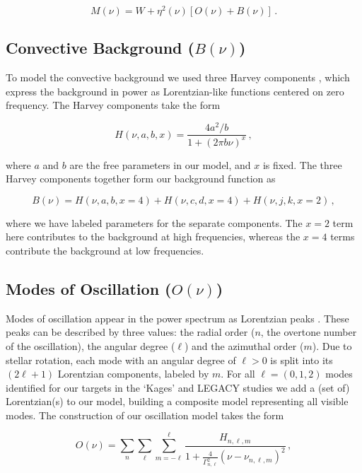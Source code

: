 \begin{equation}\label{eq:model}
	M(\nu) = W + \eta^2(\nu)[O(\nu) + B(\nu)]\, .
\end{equation}

\subsection{Convective Background ($B(\nu)$)}
To model the convective background we used three Harvey components \cite{harvey1985}, which express the background in power as Lorentzian-like functions centered on zero frequency. The Harvey components take the form 

\begin{equation}
	H(\nu, a, b, x) = \frac{4a^2/b}{1 + (2\pi b\nu)^x}\, ,
\end{equation}

\noindent where $a$ and $b$ are the free parameters in our model, and $x$ is fixed. The three Harvey components together form our background function as

\begin{equation}\label{eq:background}
	B(\nu) = H(\nu, a, b, x=4) + H(\nu, c, d, x=4) + H(\nu, j, k, x=2)\, ,
\end{equation}

\noindent where we have labeled parameters for the separate components. The $x = 2$ term here contributes to the background at high frequencies, whereas the $x=4$ terms contribute the background at low frequencies.

\subsection{Modes of Oscillation ($O(\nu)$)}
Modes of oscillation appear in the power spectrum as Lorentzian peaks \cite{chaplin+basu2017}. These peaks can be described by three values: the radial order ($n$, the overtone number of the oscillation), the angular degree ($\ell$) and the azimuthal order ($m$). Due to stellar rotation, each mode with an angular degree of $\ell > 0$ is split into its $(2\ell +1)$ Lorentzian components, labeled by $m$. For all $\ell=(0,1,2)$ modes identified for our targets in the  `Kages'  and LEGACY studies \cite{davies+2016,lund+2017} we add a (set of) Lorentzian(s) to our model, building a composite model representing all visible modes. The construction of our oscillation model takes the form

\begin{equation}
	O(\nu) = \sum_n \sum_\ell \sum_{m=-\ell}^\ell \frac{H_{n,\ell,m}}{1 + \frac{4}{\Gamma^2_{n,\ell}}(\nu - \nu_{n,\ell,m})^2}\, ,
\end{equation}

